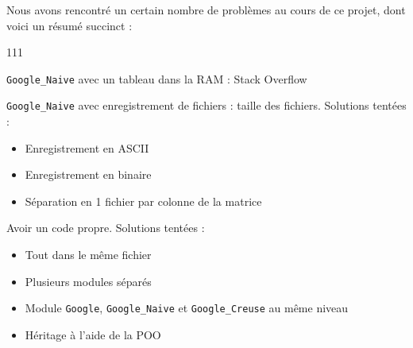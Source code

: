 Nous avons rencontré un certain nombre de problèmes au cours de ce projet, dont voici un résumé succinct :
\begin{dinglist}{111}
   \item \lstinline{Google_Naive} avec un tableau dans la RAM : Stack Overflow
   \item \lstinline{Google_Naive} avec enregistrement de fichiers : taille des fichiers. Solutions tentées :
   \begin{itemize}
      \item Enregistrement en ASCII 
      \item Enregistrement en binaire
      \item Séparation en 1 fichier par colonne de la matrice
   \end{itemize}
   \item Avoir un code propre. Solutions tentées :
   \begin{itemize}
      \item Tout dans le même fichier
      \item Plusieurs modules séparés
      \item Module \lstinline{Google}, \lstinline{Google_Naive} et \lstinline{Google_Creuse} au même niveau
      \item Héritage à l'aide de la POO
   \end{itemize}
\end{dinglist}